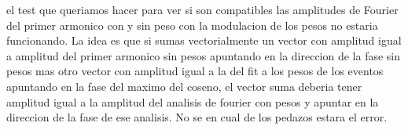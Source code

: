 

	el test que queriamos hacer para ver si son compatibles las amplitudes de Fourier del primer armonico con y sin peso con la modulacion de los pesos no estaria funcionando. La idea es que si sumas vectorialmente un vector con amplitud igual a amplitud del primer armonico sin pesos apuntando en la direccion de la fase sin pesos mas otro vector con amplitud igual a la del fit a los pesos de los eventos apuntando en la fase del maximo del coseno, el vector suma deberia tener amplitud igual a la amplitud del analisis de fourier con pesos y apuntar en la direccion de la fase de ese analisis. No se en cual de los pedazos estara el error.
	

	
		
		

	


